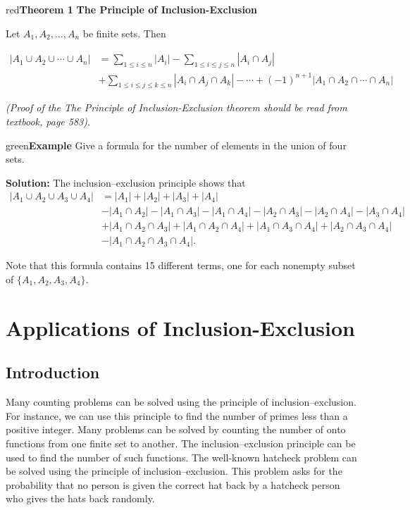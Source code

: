 \documentclass[11pt]{article}
\newenvironment{example}[1][\unskip]{\begin{mybox}{green}{\textbf{Example} {#1}}}{\end{mybox}}
\newenvironment{theorem}[1]{\begin{mybox}{red}{\textbf{Theorem #1}}}{\end{mybox}}
\begin{document}
\begin{theorem}
{1}
\textbf{The Principle of Inclusion-Exclusion}

Let $A_1, A_2, ..., A_n$ be finite sets. Then



\begin{align*}
    |A_1 \cup A_2 \cup \cdots \cup A_n| &= \sum_{1 \leq i \leq n} |A_i| - \sum_{1 \leq i \leq j \leq n} |A_i \cap A_j|\\
    &+ \sum_{1 \leq i \leq j \leq k \leq n} |A_i \cap A_j \cap A_k| - \cdots + (-1)^{n+1} |A_1 \cap A_2 \cap \cdots \cap A_n|
\end{align*}
\end{theorem}

\textit{(Proof of the The Principle of Inclusion-Exclusion theorem should be read from textbook, page 583)}.


\begin{example}
Give a formula for the number of elements in the union of four sets.

\textbf{Solution:}
The inclusion–exclusion principle shows that
\begin{align*}
    |A_1 \cup A_2 \cup A_3 \cup A_4| &= |A_1| + |A_2| + |A_3| + |A_4|\\
    &- |A_1 \cap A_2| - |A_1 \cap A_3| - |A_1 \cap A_4| - |A_2 \cap A_3| - |A_2 \cap A_4| - |A_3 \cap A_4|\\
    &+ |A_1 \cap A_2 \cap A_3| + |A_1 \cap A_2 \cap A_4| + |A_1 \cap A_3 \cap A_4| + |A_2 \cap A_3 \cap A_4|\\
    &- |A_1 \cap A_2 \cap A_3 \cap A_4|.
\end{align*}

Note that this formula contains 15 different terms, one for each nonempty subset of $\{A_1, A_2, A_3, A_4\}$.
\end{example}

\section{Applications of Inclusion-Exclusion}

\subsection{Introduction}

Many counting problems can be solved using the principle of inclusion–exclusion. For instance, we can use this principle to find the number of primes less than a positive integer. Many problems can be solved by counting the number of onto functions from one finite set to another. The inclusion–exclusion principle can be used to find the number of such functions. The well-known hatcheck problem can be solved using the principle of inclusion–exclusion. This problem asks for the probability that no person is given the correct hat back by a hatcheck person who gives the hats back randomly.
\end{document}
